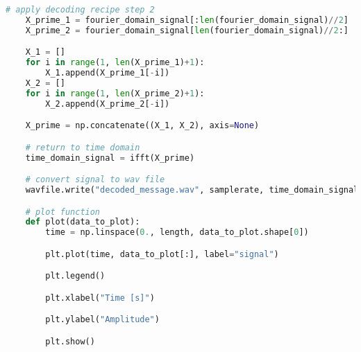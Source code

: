 \documentclass[10pt,a4paper, margin=1in]{article}
\begin{document}
\begin{enumerate}
\begin{lstlisting}[language=Python]
    # apply decoding recipe step 2
    X_prime_1 = fourier_domain_signal[:len(fourier_domain_signal)//2]
    X_prime_2 = fourier_domain_signal[len(fourier_domain_signal)//2:]

    X_1 = []
    for i in range(1, len(X_prime_1)+1):
        X_1.append(X_prime_1[-i])
    X_2 = []
    for i in range(1, len(X_prime_2)+1):
        X_2.append(X_prime_2[-i])

    X_prime = np.concatenate((X_1, X_2), axis=None)

    # return to time domain
    time_domain_signal = ifft(X_prime)

    # convert signal to wav file
    wavfile.write("decoded_message.wav", samplerate, time_domain_signal.astype(np.int16))

    # plot function
    def plot(data_to_plot):
        time = np.linspace(0., length, data_to_plot.shape[0])

        plt.plot(time, data_to_plot[:], label="signal")

        plt.legend()

        plt.xlabel("Time [s]")

        plt.ylabel("Amplitude")

        plt.show()


    \end{lstlisting}\\




\end{enumerate}
\end{document}
